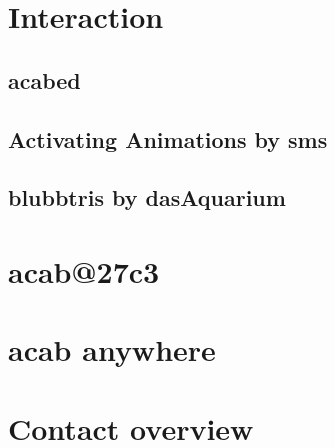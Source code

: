 \documentclass{beamer}
\begin{document}
\section{Interaction}
    \subsection{acabed}
    \subsection{Activating Animations by sms}
    \subsection{blubbtris by dasAquarium}
\section{acab@27c3}
\section{acab anywhere}
\section{Contact overview}
\end{document}
